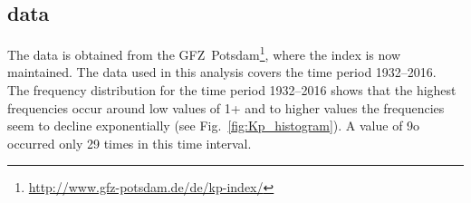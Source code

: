 \subsection{\Kp{} data}
The \Kp{} data is obtained from the GFZ~Potsdam\footnote{\url{http://www.gfz-potsdam.de/de/kp-index/}}, where the index is now maintained. The data used in this analysis covers the time period 1932--2016.\\

The \Kp{} frequency distribution for the time period 1932--2016 shows that the highest frequencies occur around low \Kp{} values of 1+ and to higher \Kp{} values the frequencies seem to decline exponentially (see Fig.~\ref{fig:Kp_histogram}). A \Kp{} value of 9o occurred only 29 times in this time interval.\\
\begin{figure}
\end{figure}

